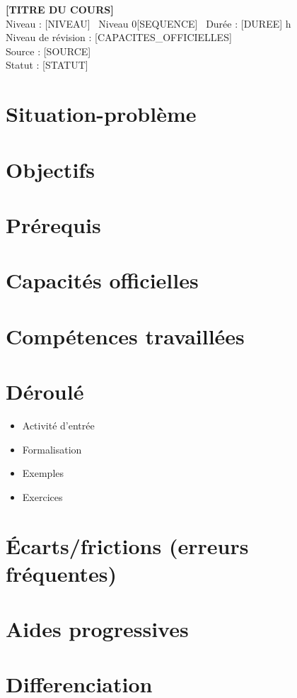 \documentclass[a4paper,11pt]{article}
\newcommand{\nsiheader}[7]{
  \begin{center}
    \textbf{\Large \color{nsiDark} #1}\\
    Niveau : #2 \textbar\ Niveau 0#3 \textbar\ Durée : #4 h\\
    Niveau de révision : #5\\
    Source : #6 \\ Statut : #7
  \end{center}
}
\begin{document}
\n\nsiheader{[TITRE DU COURS]}{[NIVEAU]}{[SEQUENCE]}{[DUREE]}{[CAPACITES_OFFICIELLES]}{[SOURCE]}{[STATUT]}

\section*{Situation-problème}

\section*{Objectifs}

\section*{Prérequis}

\section*{Capacités officielles}

\section*{Compétences travaillées}

\section*{Déroulé}
\begin{itemize}
  \item Activité d'entrée
  \item Formalisation
  \item Exemples
  \item Exercices
\end{itemize}

\section*{Écarts/frictions (erreurs fréquentes)}

\section*{Aides progressives}

\section*{Differenciation}
\end{document}
